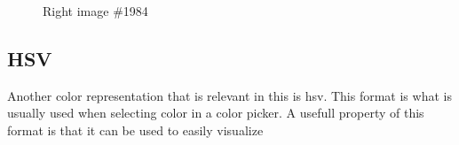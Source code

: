 \begin{figure}[H]
    \centering
    \caption{Right image \#1984}
    \label{fig:picture_1984}
\end{figure}


\subsection{HSV}
Another color representation that is relevant in this \master is \gls{hsv}.
This format is what is usually used when selecting color in a color picker.
A usefull property of this format is that it can be used to easily visualize